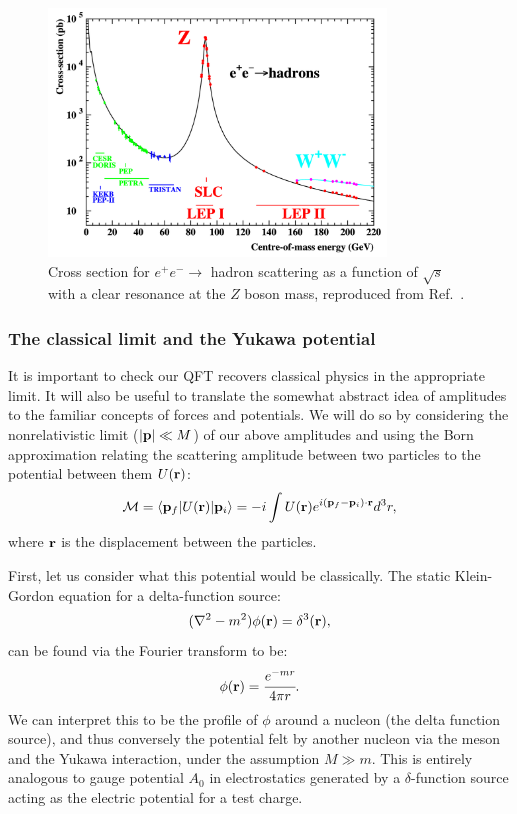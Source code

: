 \begin{figure}
	\centering
	\includegraphics[width=0.8\textwidth]{figures/01-SM-02-QFT/eezpeak}
	\caption{Cross section for $e^+e^- \rightarrow$ hadron scattering as a function of $\sqrt{s}$ with a clear resonance at the $Z$ boson mass, reproduced from Ref.~\cite{ALEPH:2005ab}.}
	\label{fig:01_qft_interactions_eezpeak}
\end{figure}


\subsubsection{The classical limit and the Yukawa potential}

It is important to check our QFT recovers classical physics in the appropriate limit.
It will also be useful to translate the somewhat abstract idea of amplitudes to the familiar concepts of forces and potentials.
We will do so by considering the nonrelativistic limit ($\left\lvert \mathbf{p} \right\rvert \ll M$) of our above amplitudes and using the Born approximation relating the scattering amplitude between two particles to the potential between them $U(\mathbf{r})$:
\begin{equation}
	\label{eq:01_qft_interactions_born}
	\mathcal M = \braket{\mathbf{p}_f|U(\mathbf{r})|\mathbf{p}_i} = -i \int U(\mathbf{r}) e^{i(\mathbf{p}_f - \mathbf{p}_i)\cdot\mathbf{r}} d^3r,
\end{equation}
where $\mathbf{r}$ is the displacement between the particles.

First, let us consider what this potential would be classically.
The static Klein-Gordon equation for a delta-function source:
\begin{equation}
	\label{eq:01_qft_interactions_static_kg}
	(\nabla^2 - m^2) \phi(\mathbf{r}) = \delta^3(\mathbf{r}),
\end{equation}
can be found via the Fourier transform to be:
\begin{equation}
	\label{eq:01_qft_interactions_static_kg_solution}
	\phi(\mathbf{r}) =  \cfrac{e^{-mr}}{4\pi r}.
\end{equation}
We can interpret this to be the profile of $\phi$ around a nucleon (the delta function source), and thus conversely the potential felt by another nucleon via the meson and the Yukawa interaction, under the assumption $M \gg m$.
This is entirely analogous to gauge potential $A_0$ in electrostatics generated by a $\delta$-function source acting as the electric potential for a test charge.

